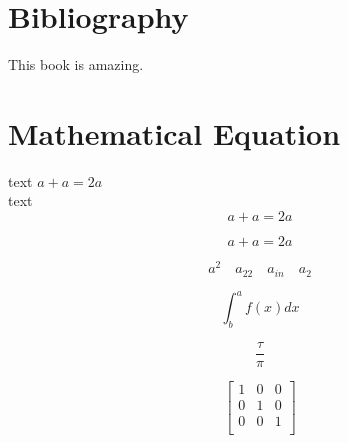\documentclass{article}
\begin{document}
\section{Bibliography}

This book \cite{deng2009imagenet} is amazing. 


\section{Mathematical Equation}

text $ a + a = 2a $\\

text $$ a + a = 2a $$

\begin{equation}
	a + a = 2a
\end{equation}

$$ a^2 \quad a_22 \quad a_{in} \quad a_{2} $$

$$ \int^a_b f(x)dx $$

$$ \frac{\tau}{\pi} $$

\begin{equation}
	\begin{bmatrix}
		1 & 0 & 0 \\
		0 & 1 & 0 \\
		0 & 0 & 1 \\
	\end{bmatrix}
\end{equation}




\end{document}
